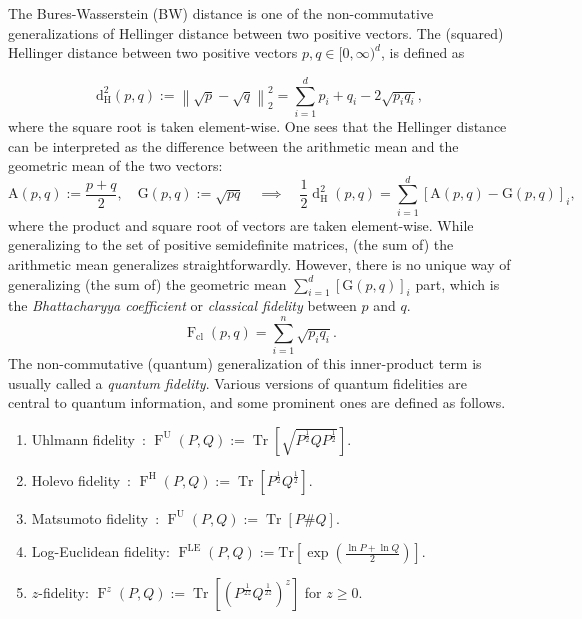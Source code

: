 \documentclass[12pt]{article}
\theoremstyle{definition}
\begin{document}
The Bures-Wasserstein (BW) distance is one of the non-commutative generalizations of Hellinger distance between two positive vectors. The (squared) Hellinger distance between two positive vectors $p,q \in [0, \infty)^d$,  is defined as

\begin{equation}
  \mathrm{d}^2_\mathrm{H}(p,q) := \left\| \sqrt{p}  - \sqrt{q} \right\|_2^2 = \sum_{i=1}^{d} p_i+ q_i - 2 \sqrt{p_i q_i},  
\end{equation}
where the square root is taken element-wise. One sees that the Hellinger distance can be interpreted as the difference between the arithmetic mean and the geometric mean of the two vectors:
\begin{equation}
    \mathrm{A}(p,q) := \frac{p+q}{2}, \quad \mathrm{G}(p,q) := \sqrt{pq} \quad  \implies \quad    
    \frac12\operatorname{d}^2_\mathrm H(p,q) = \sum_{i=1}^d \left[\mathrm{A}(p,q) - \mathrm{G}(p,q)\right]_i,
\end{equation} 
where the product and square root of vectors are taken element-wise.
While generalizing to the set of positive semidefinite matrices, (the sum of) the arithmetic mean generalizes straightforwardly. However, there is no unique way of generalizing (the sum of) the geometric mean $\sum_{i=1}^{d} [\mathrm{G}(p,q)]_i$ part, which is the \textit{Bhattacharyya coefficient} or \textit{classical fidelity} between $p$ and $q$. 
\begin{equation}
    \operatorname{F}_\text{cl}(p,q) = \sum_{i=1}^{n} \sqrt{p_i q_i}.
\end{equation}
The non-commutative (quantum) generalization of this inner-product term is usually called a \textit{quantum fidelity}. Various versions of quantum fidelities are central to quantum information, and some prominent ones are defined as follows. 
\begin{enumerate}
    \item Uhlmann fidelity~\cite{uhlmann1976transition, jozsa1994fidelity, nielsen2001quantum, watrous2018theory}: $\operatorname{F}^\mathrm U(P,Q) := \operatorname{Tr}\left[\sqrt{P ^{\frac12} Q P ^{\frac12} }\right]$.
    \item Holevo fidelity~\cite{Holevo1972, WildeRecoverability2018}: $\operatorname{F}^\mathrm H(P,Q) := \operatorname{Tr}\left[P ^{\frac12} Q^{\frac12} \right]$.
    \item Matsumoto fidelity~\cite{matsumoto2010reverse, cree2020fidelity}: $\operatorname{F}^\mathrm U(P,Q) := \operatorname{Tr}\left[ P \# Q\right]$.
    \item Log-Euclidean fidelity: $     \operatorname{F}^{\operatorname{LE}}(P,Q) := \text{Tr}\left[\exp \left( \frac{\ln P + \ln Q}{2} \right)\right].$
    \item $z$-fidelity: $\operatorname{F}^z(P,Q) := \operatorname{Tr}\left[ \left(P^{\frac{1}{2z}} Q^\frac{1}{2z}\right)^z \right]$ for $z \geq 0$. 
    
\end{enumerate}
\end{document}
